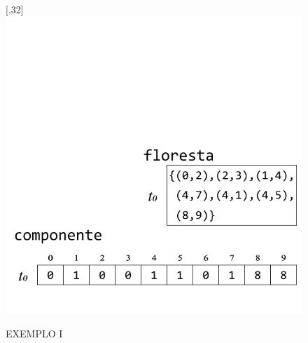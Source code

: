 \documentclass[12pt]{article}
\begin{document}
\begin{figure}
	\subcaptionbox{}[.32\textwidth]
	{
		\includegraphics[width=\linewidth]{F.pdf}
	}
	\caption{EXEMPLO I}
\end{figure}
\end{document}
